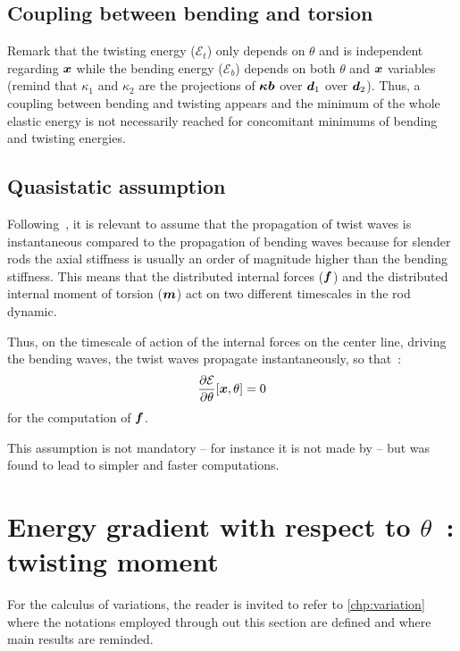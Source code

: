 \subsection{Coupling between bending and torsion}
Remark that the twisting energy ($\mathcal{E}_{t}$) only depends on $\theta$ and is independent regarding $\boldsymbol{x}$ while the bending energy ($\mathcal{E}_{b}$) depends on both $\theta$ and $\boldsymbol{x}$ variables (remind that $\kappa_1$ and $\kappa_2$ are the projections of $\boldsymbol{\kappa b}$ over $\boldsymbol{d}_1$ over $\boldsymbol{d}_2$). Thus, a coupling between bending and twisting appears and the minimum of the whole elastic energy is not necessarily reached for concomitant minimums of bending and twisting energies.

\subsection{Quasistatic assumption}
Following~, it is relevant to assume that the propagation of twist waves is instantaneous compared to the propagation of bending waves because for slender rods the axial stiffness is usually an order of magnitude higher than the bending stiffness. This means that the distributed internal forces ($\boldsymbol{f}$) and the  distributed internal moment of torsion ($\boldsymbol{m}$) act on two different timescales in the rod dynamic.

Thus, on the timescale of action of the internal forces on the center line, driving the bending waves, the twist waves propagate instantaneously, so that~:
\begin{equation}
	\frac{\partial \mathcal{E}}{\partial\theta}[\boldsymbol{x}, \theta]=0
\label{eq:quasistat_hyp}
\end{equation}
for the computation of $\boldsymbol{f}$.

This assumption is not mandatory -- for instance it is not made by  -- but was found to lead to simpler and faster computations.

\section{Energy gradient with respect to $\theta$~: twisting moment}\label{sec:dE_dtheta}

For the calculus of variations, the reader is invited to refer to \cref{chp:variation} where the notations employed through out this section are defined and where main results are reminded. 

